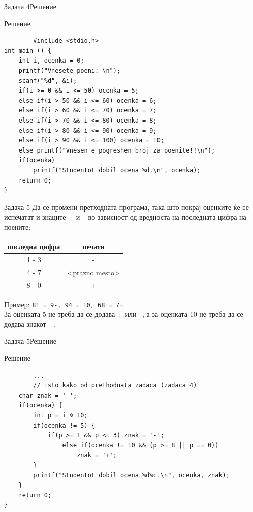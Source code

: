 \begin{frame}[fragile]{Задача 4}{Решение}
\begin{exampleblock}{Решение}
        \begin{lstlisting}
        #include <stdio.h>
int main () { 
    int i, ocenka = 0;
    printf("Vnesete poeni: \n");
    scanf("%d", &i);
    if(i >= 0 && i <= 50) ocenka = 5;
    else if(i > 50 && i <= 60) ocenka = 6;
    else if(i > 60 && i <= 70) ocenka = 7;
    else if(i > 70 && i <= 80) ocenka = 8;
    else if(i > 80 && i <= 90) ocenka = 9;
    else if(i > 90 && i <= 100) ocenka = 10;
    else printf("Vnesen e pogreshen broj za poenite!!\n"); 
    if(ocenka) 
        printf("Studentot dobil ocena %d.\n", ocenka);
    return 0;
}
        \end{lstlisting}
    \end{exampleblock}
\end{frame}

\begin{frame}[fragile]{Задача 5}
Да се промени претходната програма, така што покрај оценките ќе се испечатат и знаците + и – во зависност од вредноста на последната цифра на поените:
\begin{center}
\begin{tabular}{|c|c|}
\hline \textbf{последна цифра} & \textbf{печати} \\ 
\hline 1 - 3 & - \\ 
\hline 4 - 7 & <prazno mesto> \\ 
\hline 8 - 0 & + \\ 
\hline 
\end{tabular} 
\end{center}
Пример: \texttt{81 = 9-, 94 = 10, 68 = 7+}.\\ 
За оценката 5 не треба да се додава + или –, а за оценката 10 не треба да се додава знакот +.
\end{frame}


\begin{frame}[fragile]{Задача 5}{Решение}
    \begin{exampleblock}{Решение}
        \begin{lstlisting}
        ... 
        // isto kako od prethodnata zadaca (zadaca 4)
    char znak = ' ';
    if(ocenka) {
        int p = i % 10;
        if(ocenka != 5) {
            if(p >= 1 && p <= 3) znak = '-';
                else if(ocenka != 10 && (p >= 8 || p == 0)) 
                    znak = '+';
        }
        printf("Studentot dobil ocena %d%c.\n", ocenka, znak);
    }
    return 0;
}
        \end{lstlisting}
    \end{exampleblock}
\end{frame}



